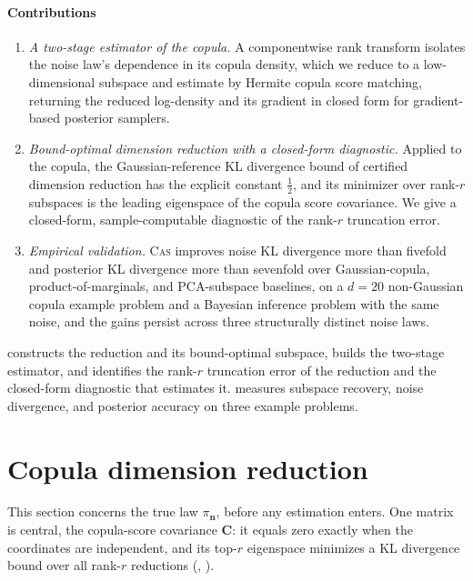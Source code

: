 \documentclass[review,hidelinks,onefignum,onetabnum]{siamart251216}
\newcommand{\mC}{\bm{C}}
\newcommand{\vn}{\bm{n}}
\begin{document}
\paragraph{Contributions}
\begin{enumerate}[leftmargin=*,topsep=2pt,itemsep=2pt]
\item \emph{A two-stage estimator of the copula.} A componentwise rank transform isolates the noise law's dependence in its copula density, which we reduce to a low-dimensional subspace and estimate by Hermite copula score matching, returning the reduced log-density and its gradient in closed form for gradient-based posterior samplers.

\item \emph{Bound-optimal dimension reduction with a closed-form diagnostic.} Applied to the copula, the Gaussian-reference KL divergence bound of certified dimension reduction \cite{ZahmCuiLawSpantiniMarzouk2022} has the explicit constant $\tfrac12$, and its minimizer over rank-$r$ subspaces is the leading eigenspace of the copula score covariance. We give a closed-form, sample-computable diagnostic of the rank-$r$ truncation error.

\item \emph{Empirical validation.} \textsc{Cas} improves noise KL divergence more than fivefold and posterior KL divergence more than sevenfold over Gaussian-copula, product-of-marginals, and PCA-subspace baselines, on a $d=20$ non-Gaussian copula example problem and a Bayesian inference problem with the same noise, and the gains persist across three structurally distinct noise laws.
\end{enumerate}

 constructs the reduction and its bound-optimal subspace,  builds the two-stage estimator, and  identifies the rank-$r$ truncation error of the reduction and the closed-form diagnostic that estimates it.  measures subspace recovery, noise divergence, and posterior accuracy on three example problems.

\section{Copula dimension reduction}
\label{sec:method}

This section concerns the true law $\pi_{\vn}$, before any estimation enters. One matrix is central, the copula-score covariance $\mC$: it equals zero exactly when the coordinates are independent, and its top-$r$ eigenspace minimizes a KL divergence bound over all rank-$r$ reductions (, ).
\end{document}
